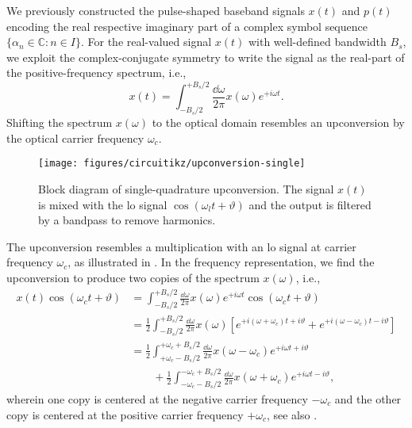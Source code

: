 We previously constructed the pulse-shaped baseband signals $x(t)$ and $p(t)$ encoding the real respective imaginary part of a complex symbol sequence $\{\alpha_n\in\mathbb{C}\colon n\in I\}$.
For the real-valued signal $x(t)$ with well-defined bandwidth $B_s$, we exploit the complex-conjugate symmetry to write the signal as the real-part of the positive-frequency spectrum, i.e.,
\begin{equation}
	x(t)
	=
	\int_{-B_s/2}^{+B_s/2}
	\frac{\dd{\omega}}{2\pi}
	x(\omega)
	e^{+i\omega t}
	.
\end{equation}
Shifting the spectrum $x(\omega)$ to the optical domain resembles an upconversion by the optical carrier frequency $\omega_c$.
\begin{figure}[htb]
	\centering
	\texttt{[image: figures/circuitikz/upconversion-single]}
	\caption{Block diagram of single-quadrature upconversion. The signal $x(t)$ is mixed with the \gls{lo} signal $\cos(\omega_lt+\vartheta)$ and the output is filtered by a bandpass to remove harmonics.}\label{fig:upconversion_single}
\end{figure}
The upconversion resembles a multiplication with an \gls{lo} signal at carrier frequency $\omega_c$, as illustrated in .
In the frequency representation, we find the upconversion to produce two copies of the spectrum $x(\omega)$, i.e.,
\begin{equation}
	\begin{split}
		x(t)
		\cos(\omega_ct+\vartheta)
		&=
		\int_{-B_s/2}^{+B_s/2}
		\frac{\dd{\omega}}{2\pi}
		x(\omega)
		e^{+i\omega t}
		\cos(\omega_ct+\vartheta)
		\\
		&=
		\frac{1}{2}
		\int_{-B_s/2}^{+B_s/2}
		\frac{\dd{\omega}}{2\pi}
		x(\omega)
		\left[
			e^{+i(\omega+\omega_c)t+i\vartheta}
			+
			e^{+i(\omega-\omega_c)t-i\vartheta}
		\right]
		\\
		&=
		\frac{1}{2}
		\int_{+\omega_c-B_s/2}^{+\omega_c+B_s/2}
		\frac{\dd{\omega}}{2\pi}
		x(\omega-\omega_c)
		e^{+i\omega t+i\vartheta}
		\\
		&\qquad+
		\frac{1}{2}
		\int_{-\omega_c-B_s/2}^{-\omega_c+B_s/2}
		\frac{\dd{\omega}}{2\pi}
		x(\omega+\omega_c)
		e^{+i\omega t-i\vartheta}
		,
	\end{split}
	\label{eq:upconversion_real}
\end{equation}
wherein one copy is centered at the negative carrier frequency $-\omega_c$ and the other copy is centered at the positive carrier frequency $+\omega_c$, see also .
